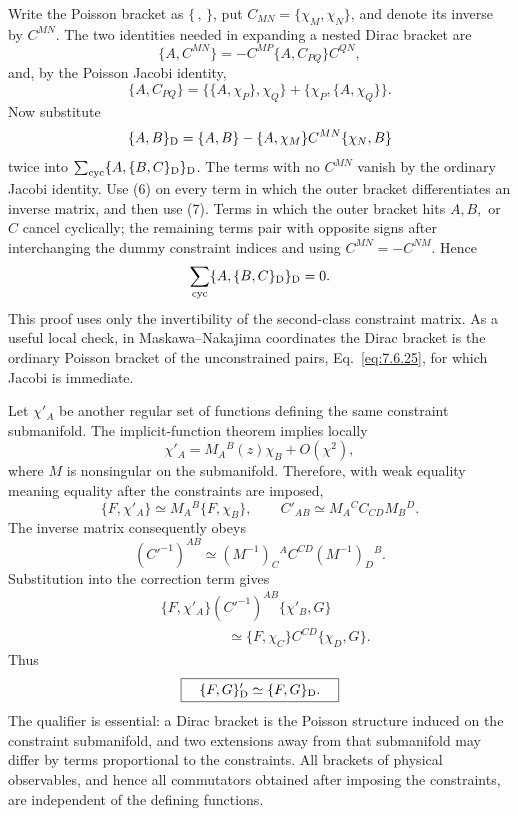 \begin{enumerate}
Write the Poisson bracket as \(\{\, ,\,\}\), put
\(C_{MN}=\{\chi_M,\chi_N\}\), and denote its inverse by \(C^{MN}\).
The two identities needed in expanding a nested Dirac bracket are
\[
 \{A,C^{MN}\}
 =-C^{MP}\{A,C_{PQ}\}C^{QN},
\tag{6}
\]
and, by the Poisson Jacobi identity,
\[
 \{A,C_{PQ}\}
 =\{\{A,\chi_P\},\chi_Q\}
  +\{\chi_P,\{A,\chi_Q\}\}.
\tag{7}
\]
Now substitute
\[
 \{A,B\}_{\rm D}
 =\{A,B\}-\{A,\chi_M\}C^{MN}\{\chi_N,B\}
\]
twice into
\(\sum_{\rm cyc}\{A,\{B,C\}_{\rm D}\}_{\rm D}\).
The terms with no \(C^{MN}\) vanish by the ordinary Jacobi identity.
Use (6) on every term in which the outer bracket differentiates an
inverse matrix, and then use (7).  Terms in which the outer bracket hits
\(A,B,\) or \(C\) cancel cyclically; the remaining terms pair with
opposite signs after interchanging the dummy constraint indices and
using \(C^{MN}=-C^{NM}\).  Hence
\[
 \sum_{\rm cyc}\{A,\{B,C\}_{\rm D}\}_{\rm D}=0 .
\]
This proof uses only the invertibility of the second-class constraint
matrix.  As a useful local check, in Maskawa--Nakajima coordinates the
Dirac bracket is the ordinary Poisson bracket of the unconstrained
pairs, Eq.~\eqref{eq:7.6.25}, for which Jacobi is immediate.

Let \(\chi'_A\) be another regular set of functions defining the same
constraint submanifold.  The implicit-function theorem implies locally
\[
 \chi'_A=M_A{}^B(z)\chi_B+O(\chi^2),
\]
where \(M\) is nonsingular on the submanifold.  Therefore, with weak
equality meaning equality after the constraints are imposed,
\[
 \{F,\chi'_A\}\simeq M_A{}^B\{F,\chi_B\},
\qquad
 C'_{AB}\simeq M_A{}^C C_{CD}M_B{}^D .
\]
The inverse matrix consequently obeys
\[
 (C'^{-1})^{AB}\simeq
 (M^{-1})_C{}^A C^{CD}(M^{-1})_D{}^B .
\]
Substitution into the correction term gives
\[
 \begin{split}
 &\{F,\chi'_A\}(C'^{-1})^{AB}\{\chi'_B,G\}\\
 &\hspace{2cm}\simeq
 \{F,\chi_C\}C^{CD}\{\chi_D,G\}.
 \end{split}
\]
Thus
\[
 \boxed{\quad \{F,G\}'_{\rm D}\simeq\{F,G\}_{\rm D}.\quad}
\]
The qualifier is essential: a Dirac bracket is the Poisson structure
induced on the constraint submanifold, and two extensions away from that
submanifold may differ by terms proportional to the constraints.  All
brackets of physical observables, and hence all commutators obtained
after imposing the constraints, are independent of the defining
functions.
\end{enumerate}
